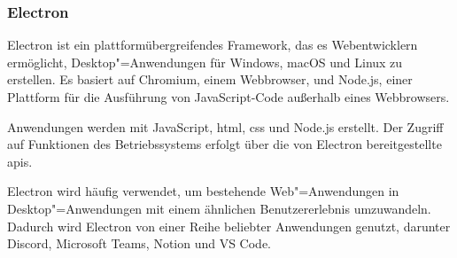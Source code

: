 \subsubsection{Electron}

Electron ist ein plattformübergreifendes Framework, das es Webentwicklern ermöglicht, Desktop"=Anwendungen für Windows, macOS und Linux zu erstellen.
Es basiert auf Chromium, einem Webbrowser, und Node.js, einer Plattform für die Ausführung von JavaScript-Code außerhalb eines Webbrowsers.
\cite{electron:docs}

Anwendungen werden mit JavaScript, \ac{html}, \ac{css} und Node.js erstellt.
Der Zugriff auf Funktionen des Betriebssystems erfolgt über die von Electron bereitgestellte \acp{api}.
\cite{electron:docs}

Electron wird häufig verwendet, um bestehende Web"=Anwendungen in Desktop"=Anwendungen mit einem ähnlichen Benutzererlebnis umzuwandeln.
Dadurch wird Electron von einer Reihe beliebter Anwendungen genutzt, darunter Discord, Microsoft Teams, Notion und VS Code.
\cite{electron}
